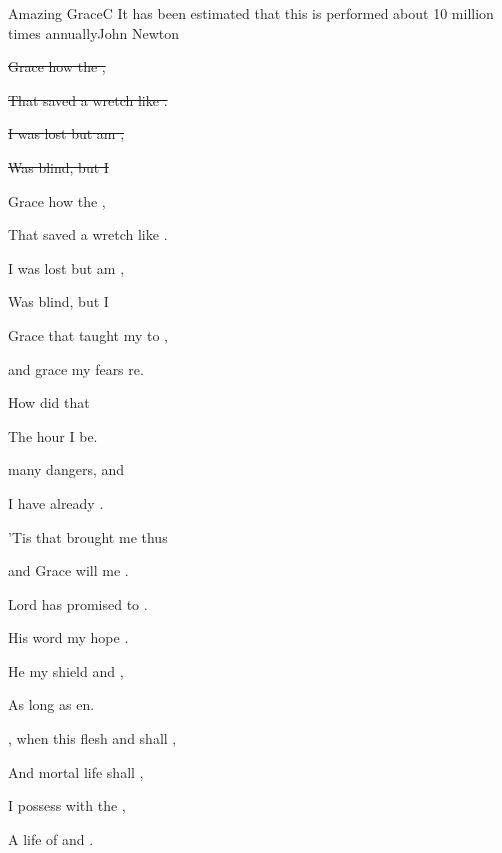 \begin{SBSong}{Amazing Grace}{C}
    {It has been estimated that this is performed about 10 million times annually}{John Newton}
  \begin{SBVerse}
    \sout{ Grace how  the ,}

    \sout{That saved a wretch like .}
    
    \sout{I  was lost but  am ,}

    \sout{Was blind, but  I }
  \end{SBVerse}
  \begin{SBVerse}
     Grace how  the ,

    That saved a wretch like .
    
    I  was lost but  am ,

    Was blind, but  I 
  \end{SBVerse}
  \begin{SBVerse}
 	 Grace that taught my  to ,

    and grace my fears re.

    How  did that  

    The hour I  be.
  \end{SBVerse}
  \begin{SBVerse}
     many dangers,  and 
    
    I have already .
    
    'Tis  that brought me  thus 
    
    and Grace will  me . 
  \end{SBVerse}
  \begin{SBVerse}
     Lord has promised  to .
    
    His word my hope .
    
    He  my shield and  ,
    
    As long as  en.
  \end{SBVerse}
  \begin{SBVerse}
    , when this flesh and  shall ,

    And mortal life shall ,

    I  possess with the ,

    A life of  and .
  \end{SBVerse}
\end{SBSong}
